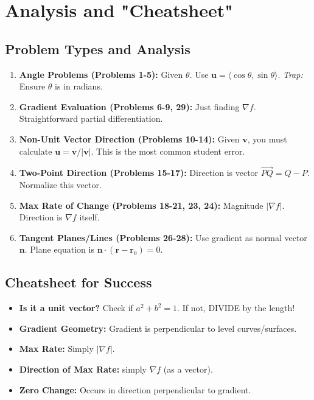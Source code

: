 \documentclass{article}
\begin{document}
\newpage

\section{Analysis and "Cheatsheet"}

\subsection{Problem Types and Analysis}
\begin{enumerate}
    \item \textbf{Angle Problems (Problems 1-5):} Given $\theta$. Use $\mathbf{u} = \langle \cos\theta, \sin\theta \rangle$. \textit{Trap:} Ensure $\theta$ is in radians.
    \item \textbf{Gradient Evaluation (Problems 6-9, 29):} Just finding $\nabla f$. Straightforward partial differentiation.
    \item \textbf{Non-Unit Vector Direction (Problems 10-14):} Given $\mathbf{v}$, you must calculate $\mathbf{u} = \mathbf{v}/|\mathbf{v}|$. This is the most common student error.
    \item \textbf{Two-Point Direction (Problems 15-17):} Direction is vector $\vec{PQ} = Q - P$. Normalize this vector.
    \item \textbf{Max Rate of Change (Problems 18-21, 23, 24):} Magnitude $|\nabla f|$. Direction is $\nabla f$ itself.
    \item \textbf{Tangent Planes/Lines (Problems 26-28):} Use gradient as normal vector $\mathbf{n}$. Plane equation is $\mathbf{n} \cdot (\mathbf{r} - \mathbf{r}_0) = 0$.
\end{enumerate}

\subsection{Cheatsheet for Success}
\begin{itemize}
    \item \textbf{Is it a unit vector?} Check if $a^2 + b^2 = 1$. If not, DIVIDE by the length!
    \item \textbf{Gradient Geometry:} Gradient is perpendicular to level curves/surfaces.
    \item \textbf{Max Rate:} Simply $|\nabla f|$.
    \item \textbf{Direction of Max Rate:} simply $\nabla f$ (as a vector).
    \item \textbf{Zero Change:} Occurs in direction perpendicular to gradient.
\end{itemize}
\end{document}
